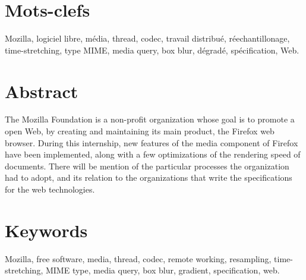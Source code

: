 \documentclass[a4paper,10pt]{article}
\begin{document}
\section*{Mots-clefs}
Mozilla, logiciel libre, média, thread, codec, travail distribué,
réechantillonage, time-stretching, type MIME, media query, box blur, dégradé,
spécification, Web.
\section*{Abstract}
The Mozilla Foundation is a non-profit organization whose goal is to promote a
open Web, by creating and maintaining its main product, the Firefox web browser.
During this internship, new features of the media component of Firefox have been
implemented, along with a few optimizations of the rendering speed of documents.
There will be mention of the particular processes the organization had to adopt,
and its relation to the organizations that write the specifications for the web
technologies.

\section*{Keywords}
Mozilla, free software, media, thread, codec, remote working, resampling,
time-stretching, MIME type, media query, box blur, gradient, specification, web.

\clearpage
{\footnotesize
\tableofcontents
}

\clearpage
\end{document}
